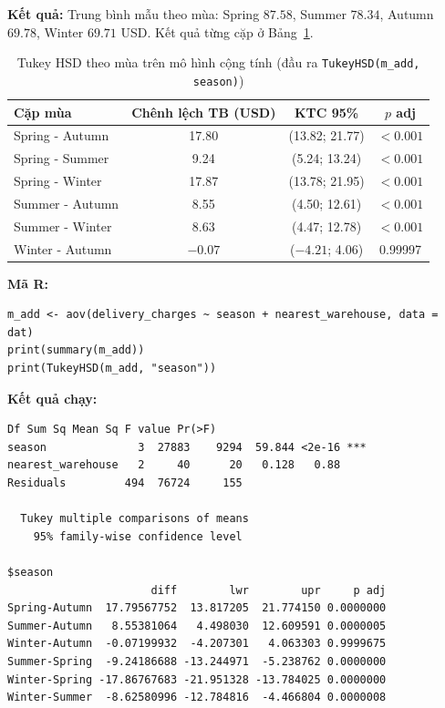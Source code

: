 \textbf{Kết quả:} Trung bình mẫu theo mùa: Spring $87.58$, Summer $78.34$, Autumn $69.78$, Winter $69.71$ USD. Kết quả từng cặp ở Bảng~\ref{tab:tukey}.
\begin{table}[H]
    \centering
    \begin{tabular}{|l|c|c|c|}
    \hline
    \textbf{Cặp mùa} & \textbf{Chênh lệch TB (USD)} & \textbf{KTC 95\%} & \textbf{$p$ adj} \\ \hline
    Spring - Autumn & 17.80 & (13.82; 21.77) & $< 0.001$ \\ \hline
    Spring - Summer  & 9.24  & (5.24; 13.24)  & $< 0.001$ \\ \hline
    Spring - Winter & 17.87 & (13.78; 21.95) & $< 0.001$ \\ \hline
    Summer - Autumn   & 8.55  & (4.50; 12.61)  & $< 0.001$ \\ \hline
    Summer - Winter  & 8.63  & (4.47; 12.78)  & $< 0.001$ \\ \hline
    Winter - Autumn & $-0.07$ & ($-4.21$; 4.06) & 0.99997 \\ \hline
    \end{tabular}
    \caption{Tukey HSD theo mùa trên mô hình cộng tính (đầu ra \texttt{TukeyHSD(m\_add, \textquotedbl season\textquotedbl)})}
    \label{tab:tukey}
\end{table}

\textbf{Mã R:}
\begin{lstlisting}
m_add <- aov(delivery_charges ~ season + nearest_warehouse, data = dat)
print(summary(m_add))
print(TukeyHSD(m_add, "season"))     
\end{lstlisting}
\textbf{Kết quả chạy:}
\begin{lstlisting}[style=rout]
                   Df Sum Sq Mean Sq F value Pr(>F)    
season              3  27883    9294  59.844 <2e-16 ***
nearest_warehouse   2     40      20   0.128   0.88    
Residuals         494  76724     155                   

  Tukey multiple comparisons of means
    95% family-wise confidence level

$season
                      diff        lwr        upr     p adj
Spring-Autumn  17.79567752  13.817205  21.774150 0.0000000
Summer-Autumn   8.55381064   4.498030  12.609591 0.0000005
Winter-Autumn  -0.07199932  -4.207301   4.063303 0.9999675
Summer-Spring  -9.24186688 -13.244971  -5.238762 0.0000000
Winter-Spring -17.86767683 -21.951328 -13.784025 0.0000000
Winter-Summer  -8.62580996 -12.784816  -4.466804 0.0000008
\end{lstlisting}


